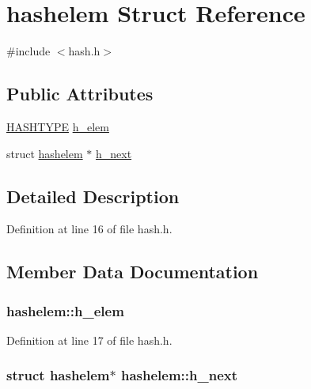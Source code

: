\hypertarget{structhashelem}{}\section{hashelem Struct Reference}
\label{structhashelem}


{\ttfamily \#include $<$hash.\+h$>$}

\subsection*{Public Attributes}
\begin{DoxyCompactItemize}
\item 
\hyperlink{cmtcmd_8h_a3dffe4cc45e97f101776f2f13669669d}{H\+A\+S\+H\+T\+Y\+PE} \hyperlink{structhashelem_a2ecf2cee8aa6a32eac1527909fd76416}{h\+\_\+elem}
\item 
struct \hyperlink{structhashelem}{hashelem} $\ast$ \hyperlink{structhashelem_ad3e98ac2e59aca36d9f5105a1a3bee6b}{h\+\_\+next}
\end{DoxyCompactItemize}


\subsection{Detailed Description}


Definition at line 16 of file hash.\+h.



\subsection{Member Data Documentation}
\subsubsection[{\texorpdfstring{h\+\_\+elem}{h_elem}}]{ hashelem\+::h\+\_\+elem}\hypertarget{structhashelem_a2ecf2cee8aa6a32eac1527909fd76416}{}\label{structhashelem_a2ecf2cee8aa6a32eac1527909fd76416}


Definition at line 17 of file hash.\+h.

\subsubsection[{\texorpdfstring{h\+\_\+next}{h_next}}]{\setlength{\rightskip}{0pt plus 5cm}struct {\bf hashelem}$\ast$ hashelem\+::h\+\_\+next}\hypertarget{structhashelem_ad3e98ac2e59aca36d9f5105a1a3bee6b}{}\label{structhashelem_ad3e98ac2e59aca36d9f5105a1a3bee6b}


